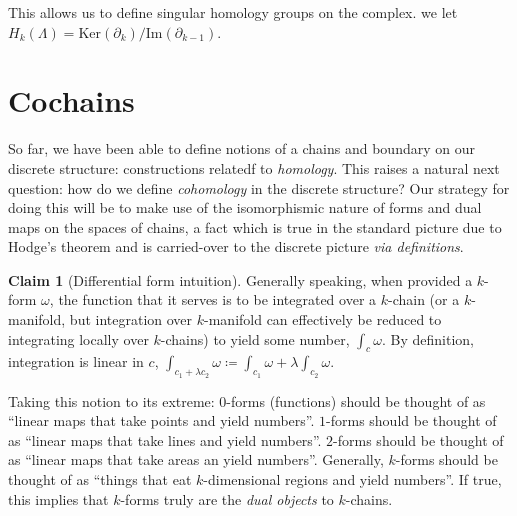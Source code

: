 \documentclass[aps,pra,showpacs,notitlepage,onecolumn,superscriptaddress,nofootinbib]{revtex4-1}
\newcommand{\pop}[1]{\textcolor{crimson}{#1}}
\newcommand{\hhrulefill}{\hspace{-1em} \hrulefill}
\theoremstyle{definition}
\newtheorem{claim}{Claim}[section]
\newtheorem{proposition}{Proposition}[section]
\begin{document}
\noindent This allows us to define singular homology groups on the complex. we let $H_k(\Lambda) = \text{Ker}(\partial_k) / \text{Im}(\partial_{k - 1})$.

\section{Cochains}

\noindent So far, we have been able to define notions of a chains and boundary on our discrete structure: constructions relatedf to \emph{homology}. This raises a natural next question:
how do we define \emph{cohomology} in the discrete structure? Our strategy for doing this will be to make use of the isomorphismic nature of forms and dual maps on the spaces of chains,
a fact which is true in the standard picture due to Hodge's theorem and is carried-over to the discrete picture \emph{via definitions}.

\hhrulefill

\begin{claim}[Differential form intuition]
  Generally speaking, when provided a $k$-form $\omega$, the function that it serves is to be integrated over a $k$-chain (or a $k$-manifold, but integration over $k$-manifold can effectively be reduced
  to integrating locally over $k$-chains) to yield some number, $\int_{c} \omega$. By definition, integration is linear in $c$, $\int_{c_1 + \lambda c_2} \omega \coloneqq \int_{c_1} \omega + \lambda \int_{c_2} \omega$.

  Taking this notion to its extreme:
  $0$-forms (functions) should be thought of as ``linear maps that take points and yield numbers''. $1$-forms should be thought of as ``linear maps that take lines and yield numbers''. $2$-forms should be thought of as ``linear maps that take
  areas an yield numbers''. Generally, $k$-forms should be thought of as ``things that eat $k$-dimensional regions and yield numbers''. If true, this implies that $k$-forms truly are the \emph{dual objects} to $k$-chains.
\end{claim}
\end{document}
